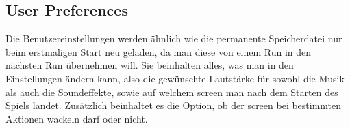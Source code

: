 \subsection{User Preferences}\label{subsec:user-prefs}
Die Benutzereinstellungen werden ähnlich wie die permanente Speicherdatei nur beim erstmaligen Start neu geladen, da man diese von einem Run in den nächsten Run übernehmen will.
Sie beinhalten alles, was man in den Einstellungen ändern kann, also die gewünschte Lautstärke für sowohl die Musik als auch die Soundeffekte, sowie auf welchem screen man nach dem Starten des Spiels landet.
Zusätzlich beinhaltet es die Option, ob der screen bei bestimmten Aktionen wackeln darf oder nicht.